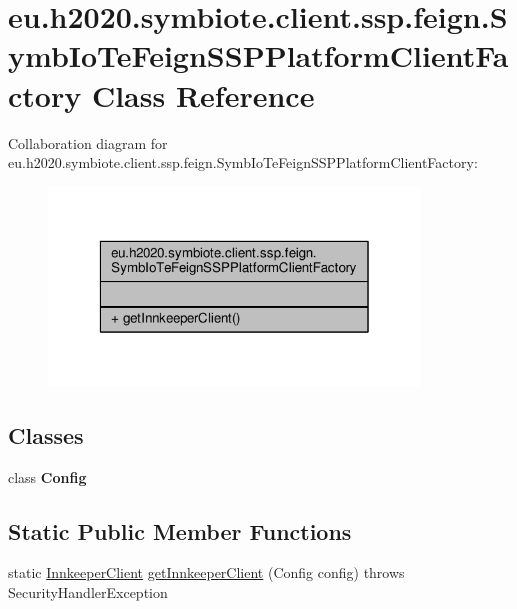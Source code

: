 \hypertarget{classeu_1_1h2020_1_1symbiote_1_1client_1_1ssp_1_1feign_1_1SymbIoTeFeignSSPPlatformClientFactory}{}\section{eu.\+h2020.\+symbiote.\+client.\+ssp.\+feign.\+Symb\+Io\+Te\+Feign\+S\+S\+P\+Platform\+Client\+Factory Class Reference}
\label{classeu_1_1h2020_1_1symbiote_1_1client_1_1ssp_1_1feign_1_1SymbIoTeFeignSSPPlatformClientFactory}


Collaboration diagram for eu.\+h2020.\+symbiote.\+client.\+ssp.\+feign.\+Symb\+Io\+Te\+Feign\+S\+S\+P\+Platform\+Client\+Factory\+:
\nopagebreak
\begin{figure}[H]
\begin{center}
\leavevmode
\includegraphics[width=280pt]{classeu_1_1h2020_1_1symbiote_1_1client_1_1ssp_1_1feign_1_1SymbIoTeFeignSSPPlatformClientFactory__coll__graph}
\end{center}
\end{figure}
\subsection*{Classes}
\begin{DoxyCompactItemize}
\item 
class {\bfseries Config}
\end{DoxyCompactItemize}
\subsection*{Static Public Member Functions}
\begin{DoxyCompactItemize}
\item 
static \hyperlink{interfaceeu_1_1h2020_1_1symbiote_1_1client_1_1ssp_1_1interfaces_1_1InnkeeperClient}{Innkeeper\+Client} \hyperlink{classeu_1_1h2020_1_1symbiote_1_1client_1_1ssp_1_1feign_1_1SymbIoTeFeignSSPPlatformClientFactory_acc2dac1fb5b7cc98e0228d6c8ae8d68e}{get\+Innkeeper\+Client} (Config config)  throws Security\+Handler\+Exception 
\end{DoxyCompactItemize}


